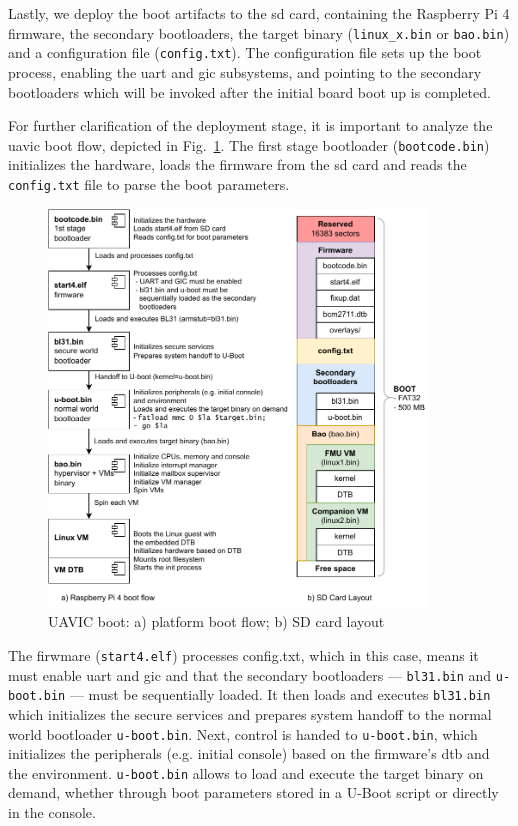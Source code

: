 Lastly, we deploy the boot artifacts to the \gls{sd} card, containing the
Raspberry Pi 4 firmware, the secondary bootloaders, the target binary
(\texttt{linux\_x.bin} or \texttt{bao.bin}) and a configuration file
(\texttt{config.txt}). The configuration file sets up the boot process, enabling
the \gls{uart} and \gls{gic} subsystems, and pointing to the secondary
bootloaders which will be invoked after the initial board boot up is completed.


For further clarification of the deployment stage, it is important to analyze
the \gls{uavic} boot flow, depicted in Fig.~\ref{fig:uav-main-rpi4-boot}. The
first stage bootloader (\texttt{bootcode.bin}) initializes the hardware, loads
the firmware from the \gls{sd} card and reads the \texttt{config.txt} file to
parse the boot parameters.

\begin{figure}[!hbt]
  \centering
  \includegraphics[width=0.9\textwidth]{./img/pdf/uav-main-rpi4-boot} 
  \caption{UAVIC boot: a) platform boot flow; b) SD card layout}%
  \label{fig:uav-main-rpi4-boot}
\end{figure}

The firwmare (\texttt{start4.elf}) processes config.txt, which in this case,
means it must enable \gls{uart} and \gls{gic} and that the secondary bootloaders
--- \texttt{bl31.bin} and \texttt{u-boot.bin} ---
must be sequentially loaded. 
%
It then loads and executes \texttt{bl31.bin} which initializes the secure
services and prepares system handoff to the normal world bootloader
\texttt{u-boot.bin}.
%
Next, control is handed to \texttt{u-boot.bin}, which initializes the peripherals
(e.g. initial console) based on the firmware's \gls{dtb} and the
environment. \texttt{u-boot.bin} allows to load and execute the target binary on
demand, whether through boot parameters stored in a U-Boot script or directly in the console.

